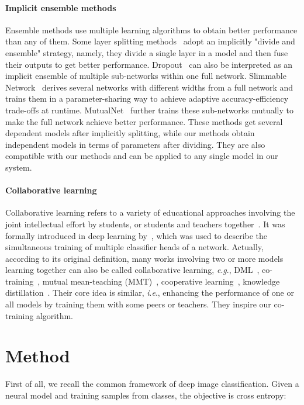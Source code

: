 \documentclass[lettersize,journal]{IEEEtran}
\newcommand{\ie}{\textit{i}.\textit{e}.}
\newcommand{\eg}{\textit{e}.\textit{g}.}
\begin{document}
\paragraph*{Implicit ensemble methods}
Ensemble methods use multiple learning algorithms to obtain better performance than
any of them.
Some layer splitting methods~\cite{2015_SzegedyLJSRAEVR15,2017_ResNeXt, zhang2020resnest}
adopt an implicitly "divide and ensemble" strategy, namely,
they divide a single layer in a model and then fuse their outputs to get better performance.
Dropout~\cite{journals/jmlr/SrivastavaHKSS14} can also be interpreted as
an implicit ensemble of multiple sub-networks within one full network.
Slimmable Network~\cite{iclr/YuYXYH19,2019_yuslimv2} derives several networks with different widths
from a full network and trains them in a parameter-sharing way to achieve adaptive
accuracy-efficiency trade-offs at runtime.
MutualNet~\cite{yang2020mutualnet} further trains these sub-networks mutually
to make the full network achieve better performance.
These methods get several dependent models after implicitly splitting,
while our methods obtain independent models
in terms of parameters after dividing. 
They are also compatible with our methods and can
be applied to any single model in our system.


\paragraph*{Collaborative learning}
Collaborative learning refers to a variety of educational approaches involving the
joint intellectual effort by students, or students and teachers together~\cite{smith1992collaborative}.
It was formally introduced in deep learning by~\cite{2018_NIPS_CDNN},
which was used to describe the simultaneous training of  
multiple classifier heads of a network.
Actually, according to its original definition, 
many works involving two or more models learning 
together can also be called collaborative learning, 
\eg, DML~\cite{2018_CVPR_DML}, co-training~\cite{1998_CO, 2018_QiaoSZWY18},
mutual mean-teaching (MMT)~\cite{2020_ICLR_MMT},  cooperative learning~\cite{2017_Coop},
knowledge distillation~\cite{2015_HintonKD}.
Their core idea is similar, \ie, 
enhancing the performance of one or all models by training them with 
some peers or teachers.
They inspire our co-training algorithm.

\section{Method}
\noindent
First of all, we recall the common framework of 
deep image classification.
Given a neural model  and
 training samples  from  classes,
the objective is cross entropy:
\end{document}
